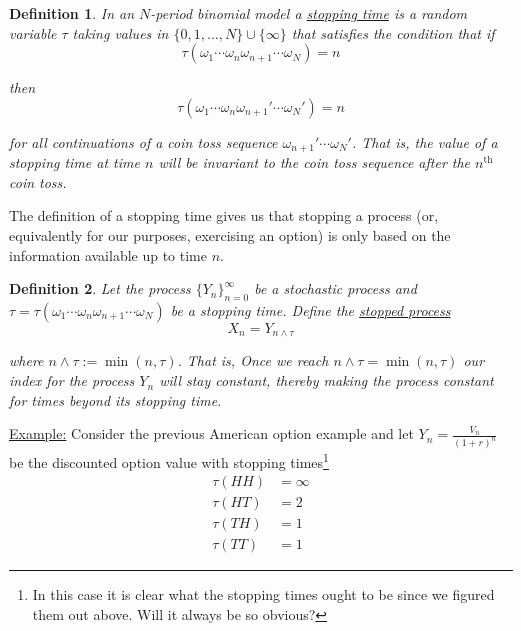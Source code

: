\documentclass[12pt]{article}
\newtheorem{definition}{Definition}
\newlength\tindent
\renewcommand{\indent}{\hspace*{\tindent}}
\begin{document}
\begin{definition} In an $N$-period binomial model a \underline{stopping time} is a random variable $\tau$ taking values in $\{0,1,...,N\}\cup\{\infty\}$ that satisfies the condition that if
\begin{equation*}
	\tau(\omega_1\cdots\omega_n\omega_{n + 1}\cdots\omega_N) = n
\end{equation*}

then
\begin{equation*}
	\tau(\omega_1\cdots\omega_n\omega_{n + 1}'\cdots\omega_N') = n
\end{equation*}

for all continuations of a coin toss sequence $\omega_{n + 1}'\cdots\omega_N'$. That is, the value of a stopping time at time $n$ will be invariant to the coin toss sequence after the $n^\text{th}$ coin toss.
\end{definition}

\indent The definition of a stopping time gives us that stopping a process (or, equivalently for our purposes, exercising an option) is only based on the information available up to time $n$. \\


\begin{definition} Let the process $\{Y_n\}^\infty_{n = 0}$ be a stochastic process and $\tau = \tau(\omega_1\cdots\omega_n\omega_{n + 1}\cdots\omega_N)$ be a stopping time. Define the \underline{stopped process}
\begin{equation*}
	X_n = Y_{n\land \tau}
\end{equation*}

where $n\land \tau := \min(n,\tau)$. That is, Once we reach $n\land\tau = \min(n,\tau)$ our index for the process $Y_n$ will stay constant, thereby making the process constant for times beyond its stopping time.
\end{definition}

\underline{Example:} Consider the previous American option example and let $Y_n = \frac{V_n}{(1 + r)^n}$ be the discounted option value with stopping times\footnote{In this case it is clear what the stopping times ought to be since we figured them out above. Will it always be so obvious?}
\begin{align*}
	\tau(HH) &= \infty \\
	\tau(HT) &= 2 \\
	\tau(TH) &= 1 \\
	\tau(TT) &= 1
\end{align*}
\end{document}
